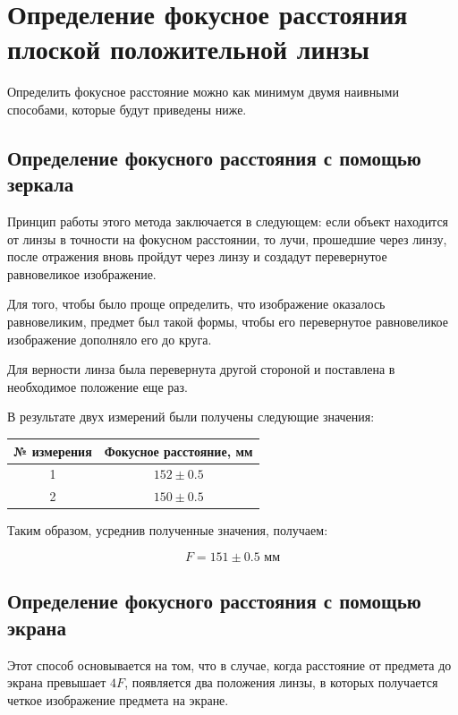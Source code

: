 \documentclass[a4paper, 12pt]{article}
\begin{document}
\section{Определение фокусное расстояния плоской положительной линзы}

Определить фокусное расстояние можно как минимум двумя наивными способами, которые будут приведены ниже.

\subsection{Определение фокусного расстояния с помощью зеркала}

Принцип работы этого метода заключается в следующем: если объект находится от линзы в точности на фокусном расстоянии, то лучи, прошедшие через линзу, после отражения вновь пройдут через линзу и создадут перевернутое равновеликое изображение.

Для того, чтобы было проще определить, что изображение оказалось равновеликим, предмет был такой формы, чтобы его перевернутое равновеликое изображение дополняло его до круга.

Для верности линза была перевернута другой стороной и поставлена в необходимое положение еще раз.

В результате двух измерений были получены следующие значения:

\begin{center}
	\begin{tabular}[H]{|c|c|}
		\hline
		№ измерения & Фокусное расстояние, мм \\
		\hline
		1 & $152 \pm 0.5$ \\
		\hline
		2 & $150 \pm 0.5$ \\
		\hline
	\end{tabular}
\end{center}

Таким образом, усреднив полученные значения, получаем:

\begin{equation*}
	\boxed{F = 151 \pm 0.5 \text{ мм}}
\end{equation*}

\subsection{Определение фокусного расстояния с помощью экрана}

Этот способ основывается на том, что в случае, когда расстояние от предмета до экрана превышает $4F$, появляется два положения линзы, в которых получается четкое изображение предмета на экране.
\end{document}

